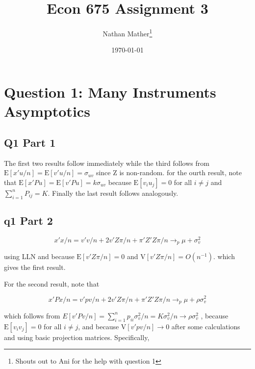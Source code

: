 \documentclass[11pt]{article}
\title{Econ 675 Assignment 3} %
\author{Nathan Mather\thanks{Shouts out to Ani for the help with question 1 }}  %
\date{\today} %
\newcommand{\plim}{\rightarrow_{p}}
\newcommand{\E}{\mathrm{E}}
\newcommand{\V}{\mathrm{V}}
\begin{document}
	
\maketitle %

\setcounter{tocdepth}{2} %

\tableofcontents %



\section{Question 1: Many Instruments Asymptotics}

\subsection{Q1 Part 1}
The first two results follow immediately while the third follows from $ \E[x'u/n] = \E[v'u/n] = \sigma_{uv}$ since Z is non-random. for the ourth result, note that $\E[x'Pu]=\E[v'Pu]=k\sigma_{uv}$ because $\E[v_iu_j] = 0$ for all $i \neq j$ and $\sum_{i=1}^{n}P_{ij} = K$. Finally the last result follows analogously. 

\subsection{q1 Part 2}

$$ x'x/n = v'v/n + 2v'Z\pi/n + \pi'Z'Z\pi /n \plim \mu + \sigma_v^2$$

using LLN and because $\E[v'Z \pi/n ] =0 $ and $\V[v'Z\pi/n] = O(n^{-1}).$ which gives the first result. 

For the second result, note that 

$$x'Px/n = v'pv/n + 2v'Z\pi/n + \pi'Z'Z\pi/n \plim \mu + \rho \sigma_v^2$$

which follows from $E[v'Pv/n] = \sum_{i=1}^{n}p_{ii} \sigma_v^2/n = K\sigma_v^2 /n \rightarrow \rho\sigma_v^2$ , because $\E[v_iv_j] = 0$ for all $i\neq j$, and because $\V[v'pv/n] \rightarrow 0$ after some calculations and using basic projection matrices. Specifically, 
\end{document}
